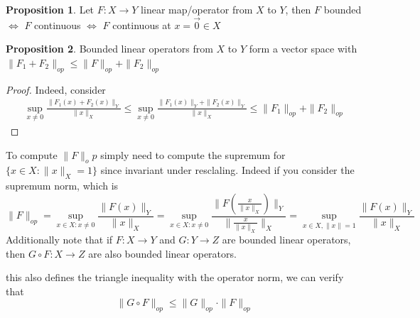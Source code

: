 \documentclass[12pt]{article}
\theoremstyle{definition}
\newtheorem{proposition}{Proposition}[section]
\begin{document}
	\begin{proposition}
		Let $F \colon X \to Y$ linear map/operator from $X$ to $Y$, then $F$ bounded $\iff$ $F$ continuous $\iff$ $F$ continuous at $x = \vec{0} \in X$

	\end{proposition}
	\begin{proposition}
		Bounded linear operators from $X$ to $Y$ form a vector space with $\|F_1 + F_2\|_{op} \leq \|F\|_{op} + \|F_2\|_{op}$
	\end{proposition}
	\begin{proof}
		Indeed, consider
		\begin{align*}
			\sup_{x \neq 0} \frac{\|F_1(x) + F_2(x)\|_Y}{\|x\|_X} \leq \sup_{x \neq 0} \frac{\|F_1(x)\|_Y + \|F_2(x)\|_Y}{\|x\|_X} \leq \|F_1\|_{op} + \|F_2\|_{op}
		\end{align*}
	\end{proof}
	To compute $\|F\|_op$ simply need to compute the supremum for $\{x \in X \colon \|x\|_X = 1\}$ since invariant under resclaling. Indeed if you consider the supremum norm, which is 
	$$
	\|F\|_{op} = \sup_{x \in X \colon x \neq 0} \frac{\|F(x)\|_Y}{\|x\|_X} = \sup_{x \in X \colon x \neq 0} \frac{\|F\left(\frac{ x }{ \|x\|_X}\right)\|_Y}{ \|\frac{ x }{ \|x\|_X} \|_X} = \sup_{x \in X, \|x\| = 1} \frac{\|F(x)\|_Y}{\|x\|_X} 
	$$
	Additionally note that if $F \colon X \to Y$ and $G \colon Y \to Z$ are bounded linear operators, then $G \circ F \colon X \to Z$ are also bounded linear operators. 

	this also defines the triangle inequality with the operator norm, we can verify that
	$$ \| G \circ F\|_{op} \leq \|G\|_{op} \cdot \|F\|_{op}$$
\end{document}
